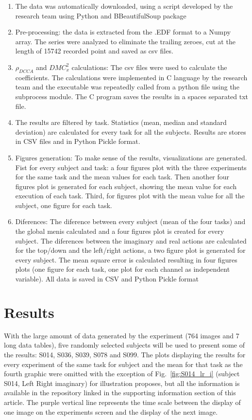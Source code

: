 \documentclass[10pt,letterpaper]{article}
\newcommand{\dmc}{\(DMC_x^2\) }
\newcommand{\pdcca}{\({\rho}_{DCCA}\) }
\begin{document}
\begin{enumerate}
	\item{The data was automatically downloaded, using a script developed by the research team using Python and BBeautifulSoup package}
	\item{Pre-processing: the data is extracted from the .EDF format to a Numpy array. The series were analyzed to eliminate the trailing zeroes, cut at the length of 15742 recorded point and saved as csv files.}
	\item{\pdcca and \dmc calculations: The csv files were used to calculate the coefficients. The calculations were implemented in C language by the research team and the executable was repeatedly called from a python file using the subprocess module. The C program saves the results in a spaces separated txt file.}
	\item{The results are filtered by task. Statistics (mean, median and standard deviation) are calculated for every task for all the subjects. Results are stores in CSV files and in Python Pickle format.}
	\item{Figures generation: To make sense of the results, visualizations are generated. Fist for every subject and task: a four figures plot with the three experiments for the same task and the mean values for each task. Then another four figures plot is generated for each subject, showing the mean value for each execution of each task. Third, for figures plot with the mean value for all the subject, one figure for each task.}
	\item{Diferences: The diference between every subject (mean of the four tasks) and the global menis calculated and a four figures plot is created for every subject. The diferences between the imaginary and real actions are calculated for the top/down and the left/right actions, a two figure plot is generated for every subject. The mean square error is calculated resulting in four figures plots (one figure for each task, one plot for each channel as independent variable). All data is saved in CSV and Python Pickle format }
\end{enumerate}

\section*{Results}

With the large amount of data generated by the experiment (764 images and 7 long data tables), five randomly selected subjects will be used to present some of the results: S014, S036, S039, S078 and S099. The plots displaying the results for every experiment of the same task for subject and the mean for that task as the fourth graphic were omitted with the exception of Fig.~\ref{fig:S014_lr_i} (subject S014, Left Right imaginary) for illustration proposes, but all the information is available in the repository linked in the supporting information section of this article. The purple vertical line represents the time scale between the display of one image on the experiments screen and the display of the next image.  
\end{document}
